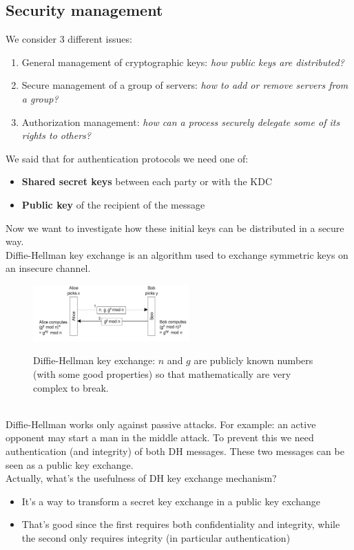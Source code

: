 \documentclass[10pt,a4paper]{article}
\begin{document}
\subsection{Security management}
We consider 3 different issues:
\begin{enumerate}
	\item General management of cryptographic keys: \textit{how public keys are distributed?}
	\item Secure management of a group of servers: \textit{how to add or remove servers from a group?}
	\item Authorization management: \textit{how can a process securely delegate some of its rights to others?}
\end{enumerate}
We said that for authentication protocols we need one of:
\begin{itemize}
	\item \textbf{Shared secret keys} between each party or with the KDC
	\item \textbf{Public key} of the recipient of the message
\end{itemize}
Now we want to investigate how these initial keys can be distributed in a secure way. \\ Diffie-Hellman key exchange is an algorithm used to exchange symmetric keys on an insecure channel.
\begin{figure}[h!]\hfill \includegraphics[width=170pt]{images/diffie-hellman.png}\hspace*{\fill}
  \label{fig:diffie-hellman}
  \caption{Diffie-Hellman key exchange: $n$ and $g$ are publicly known numbers (with some good properties) so that mathematically are very complex to break.}
\end{figure}  \\
Diffie-Hellman works only against passive attacks. For example: an active opponent may start a man in the middle attack. To prevent this we need authentication (and integrity) of both DH messages. These two messages can be seen as a public key exchange. \\
Actually, what's the usefulness of DH key exchange mechanism?
\begin{itemize}
	\item It's a way to transform a secret key exchange in a public key exchange
	\item That's good since the first requires both confidentiality and integrity, while the second only requires integrity (in particular authentication)
\end{itemize}
\end{document}
